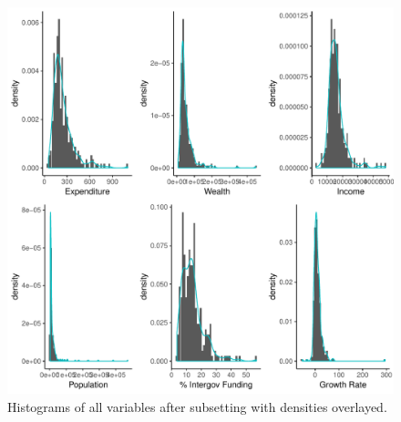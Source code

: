 \documentclass{article}\usepackage[]{graphicx}\usepackage[]{color}
\makeatletter
\def\maxwidth{ %
  \ifdim\Gin@nat@width>\linewidth
    \linewidth
  \else
    \Gin@nat@width
  \fi
}
\newenvironment{knitrout}{}{} %
\makeatother
\begin{document}
\begin{appendices}
\begin{knitrout}
\color{fgcolor}\begin{figure}[h!]
\includegraphics[width=\maxwidth]{figure/r_append_hist_subset-1} \caption[Histograms of all variables after subsetting with densities overlayed]{Histograms of all variables after subsetting with densities overlayed.}\label{fig:r append_hist_subset}
\end{figure}


\end{knitrout}



\end{appendices}
\end{document}
